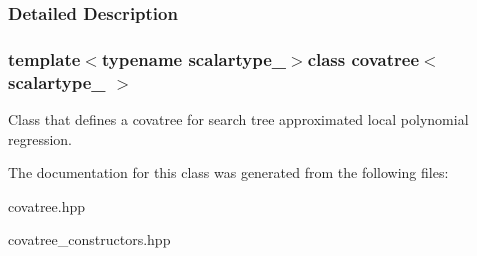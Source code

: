 \subsubsection{Detailed Description}
\subsubsection*{template$<$typename scalartype\+\_\+$>$class covatree$<$ scalartype\+\_\+ $>$}

Class that defines a covatree for search tree approximated local polynomial regression. 

The documentation for this class was generated from the following files\+:\begin{DoxyCompactItemize}
\item 
covatree.\+hpp\item 
covatree\+\_\+constructors.\+hpp\end{DoxyCompactItemize}
